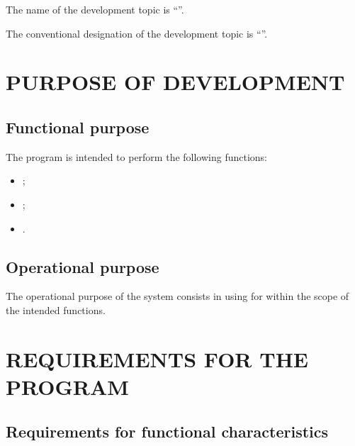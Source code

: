\documentclass[12pt,a4paper]{extarticle}
\begin{document}
The name of the development topic is \enquote{\projectname}.

The conventional designation of the development topic is \enquote{}.

\clearpage

\section{PURPOSE OF DEVELOPMENT}

\subsection{Functional purpose}

The program is intended to perform the following functions:
\begin{itemize}[nosep, leftmargin=1.25cm]
    \item {};
    \item {};
    \item {}.
\end{itemize}

\subsection{Operational purpose}

The operational purpose of the system consists in using  for  within the scope of the intended functions.

\clearpage

\section{REQUIREMENTS FOR THE PROGRAM}

\subsection{Requirements for functional characteristics}
\label{sec:functional_reqs}
\end{document}
